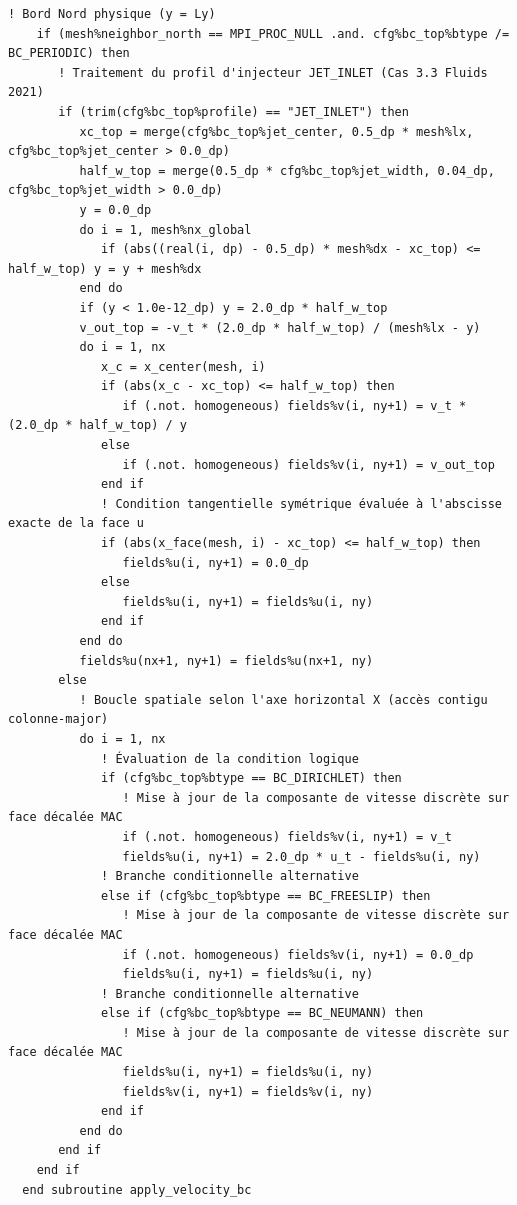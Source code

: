 \documentclass[10pt,a4paper,oneside]{book}
\begin{document}
\begin{lstlisting}[language={[95]Fortran}]
    ! Bord Nord physique (y = Ly)
    if (mesh%neighbor_north == MPI_PROC_NULL .and. cfg%bc_top%btype /= BC_PERIODIC) then
       ! Traitement du profil d'injecteur JET_INLET (Cas 3.3 Fluids 2021)
       if (trim(cfg%bc_top%profile) == "JET_INLET") then
          xc_top = merge(cfg%bc_top%jet_center, 0.5_dp * mesh%lx, cfg%bc_top%jet_center > 0.0_dp)
          half_w_top = merge(0.5_dp * cfg%bc_top%jet_width, 0.04_dp, cfg%bc_top%jet_width > 0.0_dp)
          y = 0.0_dp
          do i = 1, mesh%nx_global
             if (abs((real(i, dp) - 0.5_dp) * mesh%dx - xc_top) <= half_w_top) y = y + mesh%dx
          end do
          if (y < 1.0e-12_dp) y = 2.0_dp * half_w_top
          v_out_top = -v_t * (2.0_dp * half_w_top) / (mesh%lx - y)
          do i = 1, nx
             x_c = x_center(mesh, i)
             if (abs(x_c - xc_top) <= half_w_top) then
                if (.not. homogeneous) fields%v(i, ny+1) = v_t * (2.0_dp * half_w_top) / y
             else
                if (.not. homogeneous) fields%v(i, ny+1) = v_out_top
             end if
             ! Condition tangentielle symétrique évaluée à l'abscisse exacte de la face u
             if (abs(x_face(mesh, i) - xc_top) <= half_w_top) then
                fields%u(i, ny+1) = 0.0_dp
             else
                fields%u(i, ny+1) = fields%u(i, ny)
             end if
          end do
          fields%u(nx+1, ny+1) = fields%u(nx+1, ny)
       else
          ! Boucle spatiale selon l'axe horizontal X (accès contigu colonne-major)
          do i = 1, nx
             ! Évaluation de la condition logique
             if (cfg%bc_top%btype == BC_DIRICHLET) then
                ! Mise à jour de la composante de vitesse discrète sur face décalée MAC
                if (.not. homogeneous) fields%v(i, ny+1) = v_t
                fields%u(i, ny+1) = 2.0_dp * u_t - fields%u(i, ny)
             ! Branche conditionnelle alternative
             else if (cfg%bc_top%btype == BC_FREESLIP) then
                ! Mise à jour de la composante de vitesse discrète sur face décalée MAC
                if (.not. homogeneous) fields%v(i, ny+1) = 0.0_dp
                fields%u(i, ny+1) = fields%u(i, ny)
             ! Branche conditionnelle alternative
             else if (cfg%bc_top%btype == BC_NEUMANN) then
                ! Mise à jour de la composante de vitesse discrète sur face décalée MAC
                fields%u(i, ny+1) = fields%u(i, ny)
                fields%v(i, ny+1) = fields%v(i, ny)
             end if
          end do
       end if
    end if
  end subroutine apply_velocity_bc


\end{lstlisting}
\end{document}
